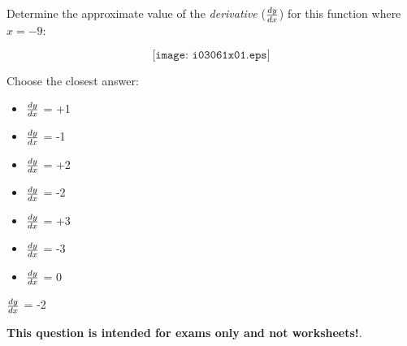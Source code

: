 

Determine the approximate value of the {\it derivative} ($dy \over dx$) for this function where $x=-9$:

$$\texttt{[image: i03061x01.eps]}$$

Choose the closest answer:

\begin{itemize}
\item{} $dy \over dx$ = +1
\vskip 10pt 
\item{} $dy \over dx$ = -1
\vskip 10pt 
\item{} $dy \over dx$ = +2
\vskip 10pt 
\item{} $dy \over dx$ = -2
\vskip 10pt 
\item{} $dy \over dx$ = +3
\vskip 10pt 
\item{} $dy \over dx$ = -3
\vskip 10pt 
\item{} $dy \over dx$ = 0
\end{itemize}







$dy \over dx$ = -2







{\bf This question is intended for exams only and not worksheets!}.



